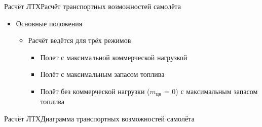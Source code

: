 \begin{frame}{Расчёт ЛТХ}{Расчёт транспортных возможностей самолёта}
    \begin{itemize}
        \item  [] \begin{block}{Основные положения}
            \begin{itemize}
            \item  [] Расчёт ведётся для трёх режимов
            \begin{itemize}
                \item  Полет с максимальной коммерческой нагрузкой
                \item Полёт с максимальным запасом топлива
                \item Полёт без коммерческой нагрузки ($m_\text{цн}$ = 0) с максимальным запасом топлива
            \end{itemize}
        \end{itemize}
        \end{block}
    \end{itemize}
\end{frame}

\begin{frame}{Расчёт ЛТХ}{Диаграмма транспортных возможностей самолёта}
\end{frame}
